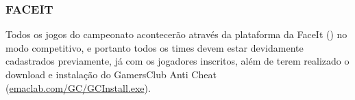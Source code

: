 \subsubsection{FACEIT}

Todos os jogos do campeonato acontecerão através da plataforma da FaceIt () no modo competitivo, e portanto todos os times devem estar devidamente cadastrados previamente, já com os jogadores inscritos, além de terem realizado o download e instalação do GamersClub Anti Cheat (\url{emaclab.com/GC/GCInstall.exe}).

